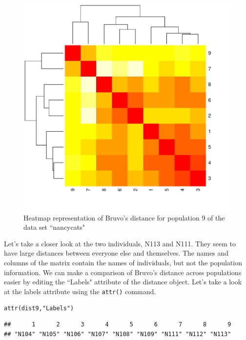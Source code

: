 \documentclass[letterpaper]{article}\usepackage[]{graphicx}\usepackage[]{color}
\makeatletter
\newcommand{\hlstr}[1]{\textcolor[rgb]{0.651,0.522,0}{#1}}%
\newcommand{\hlstd}[1]{\textcolor[rgb]{0,0,0}{#1}}%
\newcommand{\hlkwd}[1]{\textcolor[rgb]{0,0.267,0.4}{#1}}%
\newenvironment{kframe}{%
 \def\at@end@of@kframe{}%
 \ifinner\ifhmode%
  \def\at@end@of@kframe{\end{minipage}}%
  \begin{minipage}{\columnwidth}%
 \fi\fi%
 \def\FrameCommand##1{\hskip\@totalleftmargin \hskip-\fboxsep
 \colorbox{shadecolor}{##1}\hskip-\fboxsep
     \hskip-\linewidth \hskip-\@totalleftmargin \hskip\columnwidth}%
 \MakeFramed {\advance\hsize-\width
   \@totalleftmargin\z@ \linewidth\hsize
   \@setminipage}}%
 {\par\unskip\endMakeFramed%
 \at@end@of@kframe}
\newenvironment{knitrout}{}{} %
\makeatother
\begin{document}
\begin{figure}[h!]
  \centering
  \caption{\footnotesize Heatmap representation of Bruvo's distance for population 9 of the data set ``nancycats"}
  \label{bruvo_heat_map}
\begin{knitrout}\footnotesize
{}\color{fgcolor}

{\centering \includegraphics[width=0.5\linewidth]{figure/unnamed-chunk-9} 

}



\end{knitrout}

\end{figure}

Let's take a closer look at the two individuals, N113 and N111. They seem to have large distances between everyone else and themselves. The names and columns of the matrix contain the names of individuals, but not the population information. We can make a comparison of Bruvo's distance across populations easier by editing the ``Labels" attribute of the distance object. Let's take a look at the labels attribute using the \texttt{attr()} command. 
\begin{knitrout}\footnotesize
{}\color{fgcolor}\begin{kframe}
\begin{alltt}
\hlkwd{attr}\hlstd{(dist9,} \hlstr{"Labels"}\hlstd{)}
\end{alltt}
\begin{verbatim}
##      1      2      3      4      5      6      7      8      9 
## "N104" "N105" "N106" "N107" "N108" "N109" "N111" "N112" "N113"
\end{verbatim}
\end{kframe}
\end{knitrout}
\end{document}
